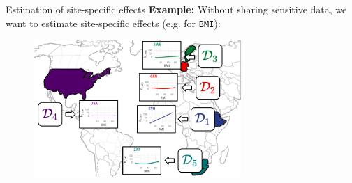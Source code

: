 \documentclass[t,10pt]{beamer}
\begin{document}
\begin{frame}{Estimation of site-specific effects}
  \textbf{Example:} Without sharing sensitive data, we want to estimate site-specific effects (e.g. for \texttt{BMI}):
  \begin{figure}
    \centering
    \includegraphics[width=0.7\textwidth]{figures/fig-site-effects.png}
  \end{figure}
\end{frame}
\end{document}
